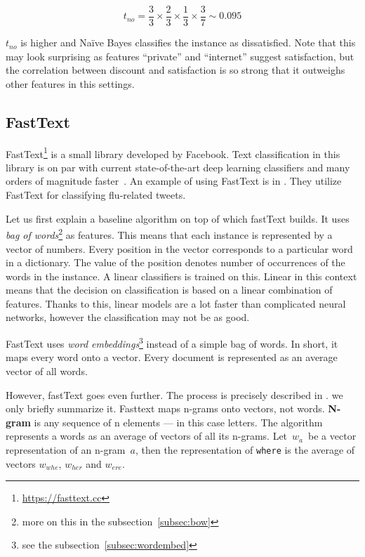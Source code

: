 \begin{equation}
	t_{no} = 
	\frac{3}{3} \times
	\frac{2}{3} \times
	\frac{1}{3} \times
	\frac{3}{7}
	\sim 0.095
\end{equation}

$t_{no}$ is higher and Na\"{i}ve Bayes classifies the instance as dissatisfied.
Note that this may look surprising as features ``private'' and ``internet'' suggest satisfaction,
but the correlation between discount and satisfaction is so strong that it outweighs other features in this settings.

\subsection{FastText}

FastText\footnote{\url{https://fasttext.cc}} is a small library developed by Facebook.
Text classification in this library is on par with current state-of-the-art deep learning classifiers
and many orders of magnitude faster~\citep{Joulin2017bag}.
An example of using FastText is in \citet{alessa2018text}.
They utilize FastText for classifying flu-related tweets.

Let us first explain a baseline algorithm on top of which fastText builds.
It uses {\it bag of words}\footnote{more on this in the subsection~\ref{subsec:bow}} as features.
This means that each instance is represented by a vector of numbers.
Every position in the vector corresponds to a particular word in a dictionary.
The value of the position denotes number of occurrences of the words in the instance.
A linear classifiers is trained on this.
Linear in this context means that the decision on classification is based on a linear combination of features.
Thanks to this, linear models are a lot faster than complicated neural networks, however the classification may not be as good.

FastText uses {\it word embeddings}\footnote{see the subsection~\ref{subsec:wordembed}} instead of a simple bag of words.
In short, it maps every word onto a vector. Every document is represented as an average vector of all words.

However, fastText goes even further.
The process is precisely described in \citet{Bojanowski2017enriching}.
we only briefly summarize it.
Fasttext maps n-grams onto vectors, not words.
{\bf N-gram} is any sequence of n elements --- in this case letters.
The algorithm represents a words as an average of vectors of all its n-grams.
Let~$w_{a}$~be a vector representation of an n-gram~$a$, then 
the representation of \texttt{where} is the average of vectors
$w_{whe}$, 
$w_{her}$ and
$w_{ere}$.

